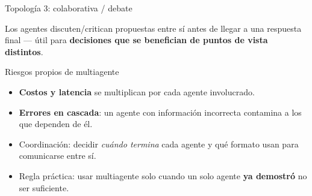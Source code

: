 \begin{frame}{Topología 3: colaborativa / debate}
  \centering
  \vfill
  \footnotesize Los agentes discuten/critican propuestas entre sí antes de
  llegar a una respuesta final — útil para \textbf{decisiones que se
  benefician de puntos de vista distintos}.
\end{frame}

\begin{frame}{Riesgos propios de multiagente}
  \begin{itemize}
    \item \textbf{Costos y latencia} se multiplican por cada agente involucrado.
    \item \textbf{Errores en cascada}: un agente con información incorrecta
      contamina a los que dependen de él.
    \item Coordinación: decidir \emph{cuándo termina} cada agente y qué
      formato usan para comunicarse entre sí.
    \item Regla práctica: usar multiagente solo cuando un solo agente
      \textbf{ya demostró} no ser suficiente.
  \end{itemize}
\end{frame}
